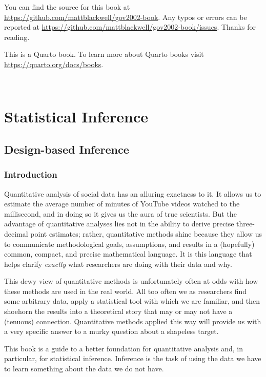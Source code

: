 \documentclass[
  13pt,
  letterpaper,
  DIV=11,
  numbers=noendperiod]{scrreprt}
\theoremstyle{definition}
\theoremstyle{definition}
\theoremstyle{plain}
\theoremstyle{remark}
\begin{document}

You can find the source for this book at
\url{https://github.com/mattblackwell/gov2002-book}. Any typos or errors
can be reported at
\url{https://github.com/mattblackwell/gov2002-book/issues}. Thanks for
reading.

This is a Quarto book. To learn more about Quarto books visit
\url{https://quarto.org/docs/books}.

\(\,\) \(\,\)

\part{Statistical Inference}

\chapter{Design-based Inference}\label{sec-design-based}

\section{Introduction}\label{introduction}

Quantitative analysis of social data has an alluring exactness to it. It
allows us to estimate the average number of minutes of YouTube videos
watched to the millisecond, and in doing so it gives us the aura of true
scientists. But the advantage of quantitative analyses lies not in the
ability to derive precise three-decimal point estimates; rather,
quantitative methods shine because they allow us to communicate
methodological goals, assumptions, and results in a (hopefully) common,
compact, and precise mathematical language. It is this language that
helps clarify \emph{exactly} what researchers are doing with their data
and why.

This dewy view of quantitative methods is unfortunately often at odds
with how these methods are used in the real world. All too often we as
researchers find some arbitrary data, apply a statistical tool with
which we are familiar, and then shoehorn the results into a theoretical
story that may or may not have a (tenuous) connection. Quantitative
methods applied this way will provide us with a very specific answer to
a murky question about a shapeless target.

This book is a guide to a better foundation for quantitative analysis
and, in particular, for statistical inference. Inference is the task of
using the data we have to learn something about the data we do not have.
\end{document}

